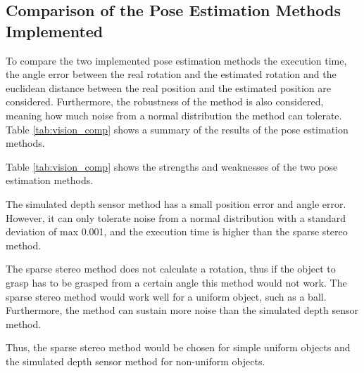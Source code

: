 \documentclass[../main.tex]{subfiles}
\begin{document}
\subsection{Comparison of the Pose Estimation Methods Implemented} \label{subsec:vision_comparison}
To compare the two implemented pose estimation methods the execution time, the angle error between the real rotation and the estimated rotation and the euclidean distance between the real position and the estimated position are considered. Furthermore, the robustness of the method is also considered, meaning how much noise from a normal distribution the method can tolerate. Table \ref{tab:vision_comp} shows a summary of the results of the pose estimation methods.

\begin{table}[H]
\centering
{}
\caption{Summary of the implemented pose estimation methods.}
\label{tab:vision_comp}
\end{table}

Table \ref{tab:vision_comp} shows the strengths and weaknesses of the two pose estimation methods. 

The simulated depth sensor method has a small position error and angle error. However, it can only tolerate noise from a normal distribution with a standard deviation of max 0.001, and the execution time is higher than the sparse stereo method.

The sparse stereo method does not calculate a rotation, thus if the object to grasp has to be grasped from a certain angle this method would not work. The sparse stereo method would work well for a uniform object, such as a ball. Furthermore, the method can sustain more noise than the simulated depth sensor method.

Thus, the sparse stereo method would be chosen for simple uniform objects and the simulated depth sensor method for non-uniform objects.
\end{document}
